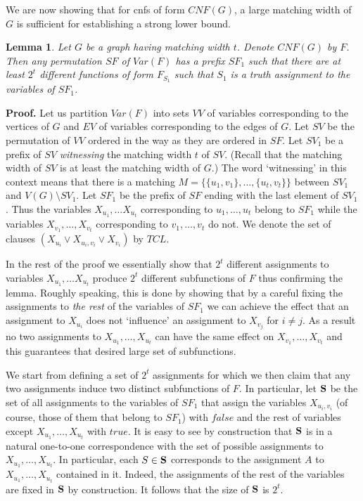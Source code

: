 \documentclass{article}
\newtheorem{lemma}{Lemma}
\begin{document}
We are now showing that for {\sc cnf}s of form $CNF(G)$, a large matching width
of $G$ is sufficient for establishing a strong lower bound. 

\begin{lemma} \label{manyass}
Let $G$ be a graph having matching width $t$.
Denote $CNF(G)$ by $F$. Then any permutation $SF$
of $Var(F)$ has a prefix $SF_1$ such that 
there are at least $2^t$ different functions of form $F_{S_1}$
such that $S_1$ is a truth assignment to the variables of $SF_1$.
\end{lemma}


{\bf Proof.}
Let us partition $Var(F)$ into sets $VV$ of variables corresponding to
the vertices of $G$ and $EV$ of variables corresponding to the edges of 
$G$. Let $SV$ be the permutation of $VV$ ordered in the way as they are ordered
in $SF$. Let $SV_1$ be a prefix of $SV$ \emph{witnessing} the matching width $t$ of $SV$.
(Recall that the matching width of $SV$ is at least the matching width of $G$.)
The word `witnessing' in this context means that there is a matching
$M=\{\{u_1,v_1\}, \dots, \{u_t,v_t\}\}$ between $SV_1$ and $V(G) \setminus SV_1$. 
Let $SF_1$ be the prefix of $SF$ ending with the last element of $SV_1$.
Thus the variables $X_{u_1}, \dots X_{u_t}$ corresponding to $u_1, \dots, u_t$ belong to
$SF_1$ while the variables $X_{v_1}, \dots, X_{v_t}$ corresponding to $v_1, \dots, v_t$
do not. We denote the set of clauses $(X_{u_i} \vee X_{u_i,v_i} \vee X_{v_i})$ by $TCL$.


In the rest of the proof we essentially show that $2^t$ different assignments to variables
$X_{u_1}, \dots X_{u_t}$ produce $2^t$ different subfunctions of $F$ thus confirming the
lemma. Roughly speaking, this is done by showing that by a careful fixing the
assignments to \emph{the rest} of the variables of $SF_1$ we can achieve the
effect that an assignment to $X_{u_i}$ does not `influence' an assignment to $X_{v_j}$ for
$i \neq j$. As a result no two assignments to $X_{u_1}, \dots, X_{u_t}$ can have the same
effect on $X_{v_1}, \dots, X_{v_t}$ and this guarantees that desired large set of subfunctions.




We start from defining a set of $2^t$ assignments for which we then claim that any two assignments
induce two distinct subfunctions of $F$.
In particular, let ${\bf S}$ be the set of all assignments
to the variables of $SF_1$ that assign the variables $X_{u_i,v_i}$  (of course,
those of them that belong to $SF_1$) with $false$
and the rest of variables except $X_{u_1}, \dots, X_{u_t}$ with $true$. 
It is easy to see by construction that ${\bf S}$ is in a natural one-to-one correspondence
with the set of possible assignments to $X_{u_1}, \dots, X_{u_t}$. In particular,
each $S \in {\bf S}$ corresponds to the assignment $A$ to $X_{u_1}, \dots,X_{u_t}$
contained in it. Indeed, the assignments of the rest of the variables are fixed
in ${\bf S}$ by construction. It follows that the size of ${\bf S}$ is $2^t$.
\end{document}
